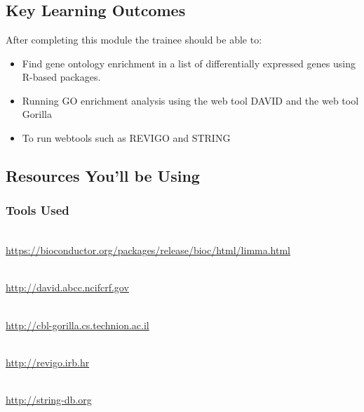 
\chapter{\moduleTitle}
\newpage


\section{Key Learning Outcomes}

After completing this module the trainee should be able to:
\begin{itemize}
  \item Find gene ontology enrichment in a list of differentially expressed genes using R-based packages.
  \item Running GO enrichment analysis using the web tool DAVID and the web tool Gorilla
  \item To run webtools such as REVIGO and STRING
  \end{itemize}

\section{Resources You'll be Using}
 
\subsection{Tools Used}
\begin{description}[style=multiline,labelindent=0cm,align=left,leftmargin=0.5cm]
  \item [Goana from Limma]\hfill\\
  	\url{https://bioconductor.org/packages/release/bioc/html/limma.html}
  \item[DAVID]\hfill\\
  	\url{http://david.abcc.ncifcrf.gov}
  \item[GOrilla]\hfill\\
  	\url{http://cbl-gorilla.cs.technion.ac.il}
  \item[REVIGO]\hfill\\
  	\url{http://revigo.irb.hr}
  \item[STRING]\hfill\\
    \url{http://string-db.org}
\end{description}


